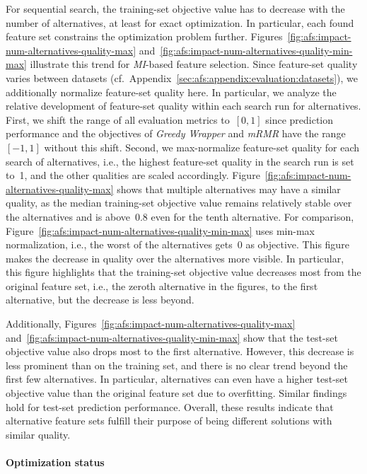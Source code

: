 \documentclass{article}
\theoremstyle{definition}
\begin{document}
For sequential search, the training-set objective value has to decrease with the number of alternatives, at least for exact optimization.
In particular, each found feature set constrains the optimization problem further.
Figures~\ref{fig:afs:impact-num-alternatives-quality-max} and~\ref{fig:afs:impact-num-alternatives-quality-min-max} illustrate this trend for \emph{MI}-based feature selection.
Since feature-set quality varies between datasets (cf.~Appendix~\ref{sec:afs:appendix:evaluation:datasets}), we additionally normalize feature-set quality here.
In particular, we analyze the relative development of feature-set quality within each search run for alternatives.
First, we shift the range of all evaluation metrics to~$[0,1]$ since prediction performance and the objectives of \emph{Greedy Wrapper} and \emph{mRMR} have the range~$[-1,1]$ without this shift.
Second, we max-normalize feature-set quality for each search of alternatives, i.e., the highest feature-set quality in the search run is set to~1, and the other qualities are scaled accordingly.
Figure~\ref{fig:afs:impact-num-alternatives-quality-max} shows that multiple alternatives may have a similar quality, as the median training-set objective value remains relatively stable over the alternatives and is above~0.8 even for the tenth alternative.
For comparison, Figure~\ref{fig:afs:impact-num-alternatives-quality-min-max} uses min-max normalization, i.e., the worst of the alternatives gets~0 as objective.
This figure makes the decrease in quality over the alternatives more visible.
In particular, this figure highlights that the training-set objective value decreases most from the original feature set, i.e., the zeroth alternative in the figures, to the first alternative, but the decrease is less beyond.

Additionally, Figures~\ref{fig:afs:impact-num-alternatives-quality-max} and~\ref{fig:afs:impact-num-alternatives-quality-min-max} show that the test-set objective value also drops most to the first alternative.
However, this decrease is less prominent than on the training set, and there is no clear trend beyond the first few alternatives.
In particular, alternatives can even have a higher test-set objective value than the original feature set due to overfitting.
Similar findings hold for test-set prediction performance.
Overall, these results indicate that alternative feature sets fulfill their purpose of being different solutions with similar quality.

\paragraph{Optimization status}
\end{document}
